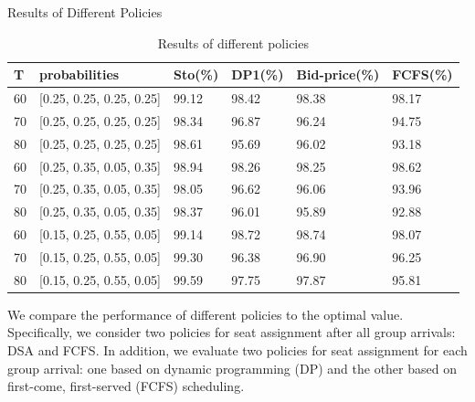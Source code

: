     \begin{frame}{Results of Different Policies}
        \scriptsize
        \begin{table}[ht]
          \centering
          \caption{Results of different policies}
          \begin{tabular}{|l|l|l|l|l|l|}
          \hline
           T & probabilities & Sto(\%) & DP1(\%) & Bid-price(\%) & FCFS(\%) \\
          \hline
           60  & [0.25, 0.25, 0.25, 0.25]  & 99.12 & 98.42 & 98.38 & 98.17 \\
           70  & [0.25, 0.25, 0.25, 0.25]  & 98.34 & 96.87 & 96.24 & 94.75 \\
           80  & [0.25, 0.25, 0.25, 0.25]  & 98.61 & 95.69 & 96.02 & 93.18 \\
           \hline
           60  & [0.25, 0.35, 0.05, 0.35]  & 98.94 & 98.26 & 98.25 & 98.62 \\
           70  & [0.25, 0.35, 0.05, 0.35]  & 98.05 & 96.62 & 96.06 & 93.96 \\
           80  & [0.25, 0.35, 0.05, 0.35]  & 98.37 & 96.01 & 95.89 & 92.88 \\
          \hline
          60  & [0.15, 0.25, 0.55, 0.05]  & 99.14 & 98.72 & 98.74 & 98.07 \\
          70  & [0.15, 0.25, 0.55, 0.05]  & 99.30 & 96.38 & 96.90 & 96.25 \\
          80  & [0.15, 0.25, 0.55, 0.05]  & 99.59 & 97.75 & 97.87 & 95.81 \\
          \hline
          \end{tabular}
        \end{table}

          We compare the performance of different policies to the optimal value. Specifically, we consider two policies for seat assignment after all group arrivals: DSA and FCFS. In addition, we evaluate two policies for seat assignment for each group arrival: one based on dynamic programming (DP) and the other based on first-come, first-served (FCFS) scheduling.
    \end{frame}
      
